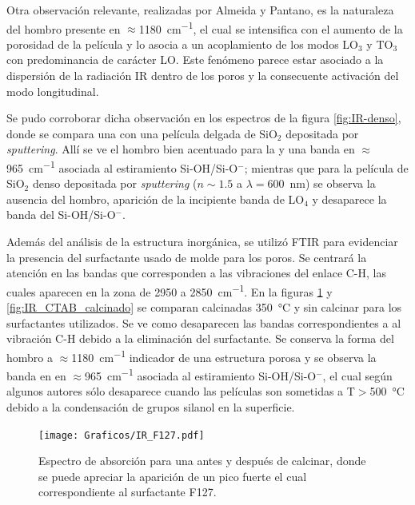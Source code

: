 		 Otra observación relevante, realizadas por Almeida y Pantano\cite{Almeida1990}, es la naturaleza del hombro presente en $\approx$\SI{1180}{\cm^{-1}}, el cual se intensifica con el aumento de la porosidad de la película y lo asocia a un acoplamiento de los modos LO$_3$ y TO$_3$ con predominancia de carácter LO. Este fenómeno parece estar asociado a la dispersión de la radiación IR dentro de los poros y la consecuente activación del modo longitudinal.	
			
		 Se pudo corroborar dicha observación en los espectros de la figura \ref{fig:IR-denso}, donde se compara una \pdm\space con una película delgada de SiO$_2$ depositada por \textit{sputtering}.  Allí se ve el hombro bien acentuado para la \pdm\space y una banda en $\approx$\SI{965}{\cm^{-1}} asociada al estiramiento Si-OH/Si-O$^-$; mientras que para la película de SiO$_2$ denso depositada por \textit{sputtering} ($n\sim 1.5$ a $\lambda=$\SI{600}{\nm})\cite{Vergohl1999} se observa la ausencia del hombro, aparición de la incipiente banda de LO$_4$ y desaparece la banda del Si-OH/Si-O$^-$.

		 Además del análisis de la estructura inorgánica, se utilizó FTIR para evidenciar la presencia del surfactante usado de molde para los poros. Se centrará la atención en las bandas que corresponden a las vibraciones del enlace C-H, las cuales aparecen en la zona de 2950 a \SI{2850}{\cm^{-1}}. En la figuras \ref{fig:IR_F127_calciando} y \ref{fig:IR_CTAB_calcinado} se comparan \pdm\space calcinadas \SI{350}{\celsius} y sin calcinar para los surfactantes utilizados. Se ve como desaparecen las bandas correspondientes a al vibración C-H debido a la eliminación del surfactante. Se conserva la forma del hombro a $\approx$\SI{1180}{\cm^{-1}} indicador de una estructura porosa y se observa la banda en en $\approx$\SI{965}{\cm^{-1}} asociada al estiramiento Si-OH/Si-O$^-$, el cual según algunos autores sólo desaparece cuando las películas son sometidas a T$>$\SI{500}{\celsius} debido a la condensación de grupos silanol en la superficie.\cite{Innocenzi2003,Almeida1990,Bertoluzza1982}

				\begin{figure}[!h]
						\begin{center}
						\texttt{[image: Graficos/IR\_F127.pdf]}
						\caption[FTIR para una \pdmF.]{Espectro de absorción para una \pdmF\space antes y después de calcinar, donde se puede apreciar la aparición de un pico fuerte el cual correspondiente al surfactante F127.}
						\label{fig:IR_F127_calciando}
						\end{center}
						\end{figure}
				
